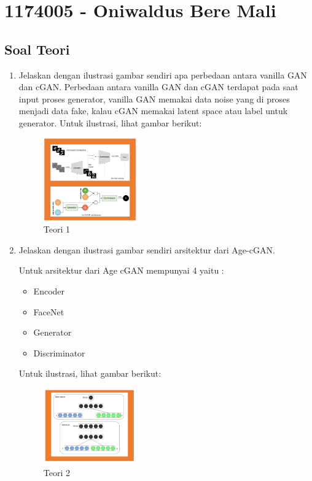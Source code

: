 \section{1174005 - Oniwaldus Bere Mali}
\subsection{Soal Teori}
\begin{enumerate}

	\item Jelaskan dengan ilustrasi gambar sendiri apa perbedaan antara vanilla GAN dan cGAN.
	\hfill\break
	Perbedaan antara vanilla GAN dan cGAN terdapat pada saat input proses generator, vanilla GAN memakai data noise yang di proses menjadi data fake, kalau cGAN memakai latent space atau label untuk generator. Untuk ilustrasi, lihat gambar berikut: 

	\begin{figure}[H]
	\centering
		\includegraphics[width=4cm]{figures/1174005/tugas9/materi/teori1.PNG}
		\caption{Teori 1 }
	\end{figure}

	\item Jelaskan dengan ilustrasi gambar sendiri arsitektur dari Age-cGAN.

	\hfill\break
	Untuk arsitektur dari Age cGAN mempunyai 4 yaitu :
	\begin{itemize}
		\item Encoder
		\item FaceNet
		\item Generator
		\item Discriminator
	\end{itemize}
	Untuk ilustrasi, lihat gambar berikut: 

	\begin{figure}[H]
	\centering
		\includegraphics[width=4cm]{figures/1174005/tugas9/materi/teori2.PNG}
		\caption{Teori 2}
	\end{figure}
	

\end{enumerate}

